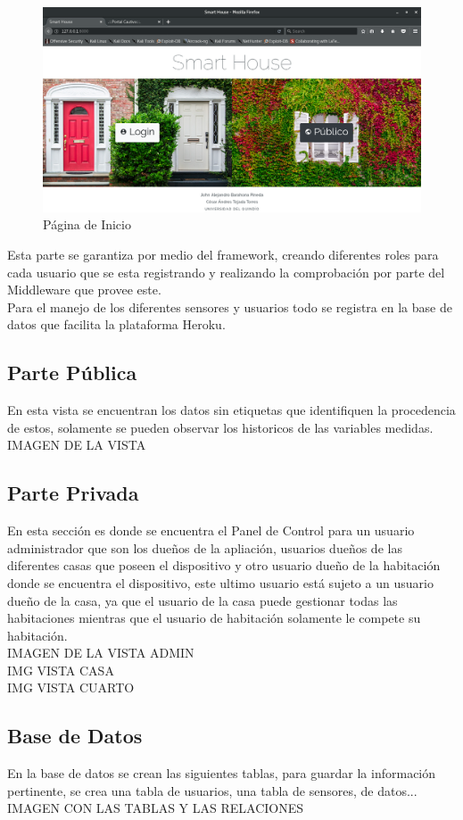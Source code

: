 \begin{figure}
	\centering
	\caption{Página de Inicio}
	\label{fig:index}
	\includegraphics[width=0.9\linewidth]{Imagenes/Index}
\end{figure}


Esta parte se garantiza por medio del framework, creando diferentes roles para cada usuario que se esta registrando y realizando la comprobación por parte del Middleware que provee este.\\

Para el manejo de los diferentes sensores y usuarios todo se registra en la base de datos que facilita la plataforma Heroku.\\

\subsection{Parte Pública}

En esta vista se encuentran los datos sin etiquetas que identifiquen la procedencia de estos, solamente se pueden observar los historicos de las variables medidas.\\

IMAGEN DE LA VISTA

\subsection{Parte Privada}

En esta sección es donde se encuentra el Panel de Control para un usuario administrador que son los dueños de la apliación, usuarios dueños de las diferentes casas que poseen el dispositivo y otro usuario dueño de la habitación donde se encuentra el dispositivo, este ultimo usuario está sujeto a un usuario dueño de la casa, ya que el usuario de la casa puede gestionar todas las habitaciones mientras que el usuario de habitación solamente le compete su habitación.\\

IMAGEN DE LA VISTA ADMIN\\

IMG VISTA CASA\\

IMG VISTA CUARTO\\

\subsection{Base de Datos}

En la base de datos se crean las siguientes tablas, para guardar la información pertinente, se crea una tabla de usuarios, una tabla de sensores, de datos...\\

IMAGEN CON LAS TABLAS Y LAS RELACIONES
